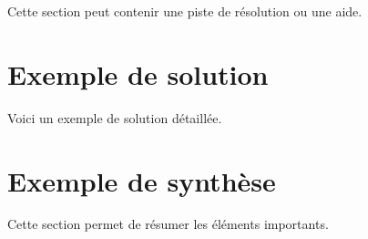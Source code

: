 \documentclass[11pt,a4paper]{article}
\begin{document}
\begin{cadreaide}
Cette section peut contenir une piste de résolution ou une aide.
\end{cadreaide}

\section{Exemple de solution}

\begin{cadresolution}
Voici un exemple de solution détaillée.
\end{cadresolution}

\section{Exemple de synthèse}

\begin{cadresynthese}
Cette section permet de résumer les éléments importants.
\end{cadresynthese}
\end{document}
